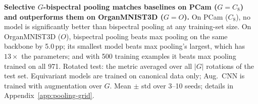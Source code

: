 \caption{\textbf{Selective $G$-bispectral pooling matches baselines on PCam ($G{=}C_8$) and
  outperforms them on OrganMNIST3D ($G{=}O$).}
  On PCam ($C_8$), no model is significantly better than bispectral pooling at any training-set size.
  On OrganMNIST3D ($O$), bispectral pooling beats max pooling on the same backbone by 5.0\,pp;
  its smallest model beats max pooling's largest, which has $13\times$ the parameters; and with
  500 training examples it beats max pooling trained on all 971.
  Rotated test: the metric averaged over all $|G|$ rotations of the test set. Equivariant models
  are trained on canonical data only; Aug.\ CNN is trained with augmentation over $G$.
  Mean $\pm$ std over 3--10 seeds; details in Appendix~\ref{app:pooling-grid}.}
\label{fig:pooling-grid}
